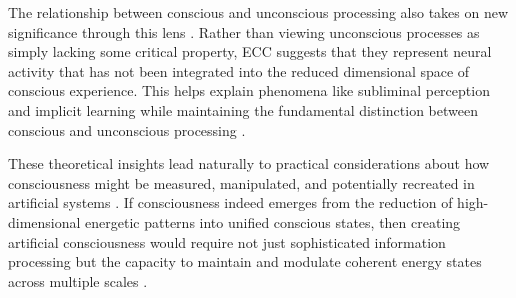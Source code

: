 The relationship between conscious and unconscious processing also takes on new significance through this lens \cite{baars2002conscious}. Rather than viewing unconscious processes as simply lacking some critical property, ECC suggests that they represent neural activity that has not been integrated into the reduced dimensional space of conscious experience. This helps explain phenomena like subliminal perception and implicit learning while maintaining the fundamental distinction between conscious and unconscious processing \cite{mashour2020conscious}.

These theoretical insights lead naturally to practical considerations about how consciousness might be measured, manipulated, and potentially recreated in artificial systems \cite{koch2017can}. If consciousness indeed emerges from the reduction of high-dimensional energetic patterns into unified conscious states, then creating artificial consciousness would require not just sophisticated information processing but the capacity to maintain and modulate coherent energy states across multiple scales \cite{tani2016exploring}.

